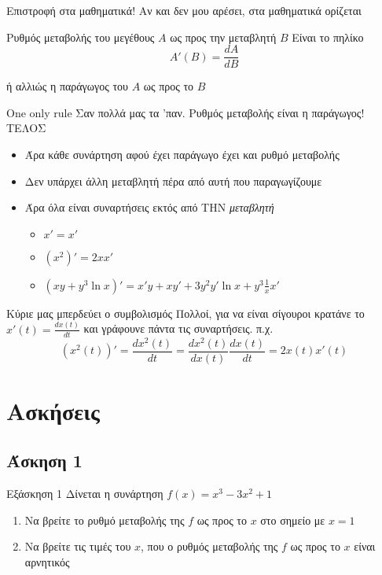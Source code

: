 \documentclass[greek]{beamer}
\begin{document}
\begin{frame}{Επιστροφή στα μαθηματικά!}
  Αν και δεν μου αρέσει, στα μαθηματικά ορίζεται
  \begin{block}{Ρυθμός μεταβολής του μεγέθους $A$ ως προς την μεταβλητή $B$}
    Είναι το πηλίκο
    $$Α'(Β)=\frac{dA}{dΒ}$$
  \end{block}
  ή αλλιώς η παράγωγος του $Α$ ως προς το $Β$
\end{frame}

\begin{frame}{One only rule}
  Σαν πολλά μας τα 'παν. Ρυθμός μεταβολής είναι η παράγωγος! ΤΕΛΟΣ
  \begin{itemize}
    \item<2-> Άρα κάθε συνάρτηση αφού έχει παράγωγο έχει και ρυθμό μεταβολής
    \item<3-> Δεν υπάρχει άλλη μεταβλητή πέρα από αυτή που παραγωγίζουμε
    \item<4-> Άρα όλα είναι συναρτήσεις εκτός από ΤΗΝ \emph{μεταβλητή}
      \begin{itemize}
        \item<5-> $x'=x'$
        \item<6-> $(x^2)'=2xx'$
        \item<7-> $(xy+y^3\ln x)'=x'y+xy'+3y^2y'\ln x+y^3\frac{1}{x}x'$
      \end{itemize}
  \end{itemize}
\end{frame}

\begin{frame}{Κύριε μας μπερδεύει ο συμβολισμός}
  Πολλοί, για να είναι σίγουροι κρατάνε το $x'(t)=\frac{dx(t)}{dt}$ και γράφουνε πάντα τις συναρτήσεις. π.χ.
  $$(x^2(t))'=\frac{dx^2(t)}{dt}=\frac{dx^2(t)}{dx(t)}\frac{dx(t)}{dt}=2x(t)x'(t)$$
\end{frame}

\section{Ασκήσεις}
\subsection{Άσκηση 1}
\begin{frame}[label=Άσκηση1]{Εξάσκηση 1}
  Δίνεται η συνάρτηση $f(x)=x^3-3x^2+1$
  \begin{enumerate}
    \item<1-> Να βρείτε το ρυθμό μεταβολής της $f$ ως προς το $x$ στο σημείο με $x=1$
    \item<2-> Να βρείτε τις τιμές του $x$, που ο ρυθμός μεταβολής της $f$ ως προς το $x$ είναι αρνητικός
  \end{enumerate}

\end{frame}
\end{document}
